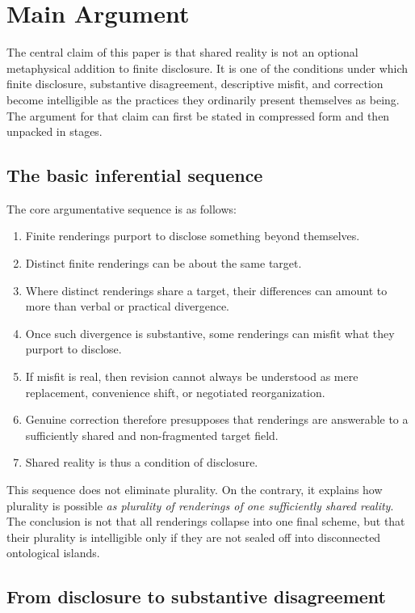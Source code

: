 \documentclass[11pt]{article}
\renewcommand{\emph}[1]{\textit{#1}}
\begin{document}
\section{Main Argument} 

The central claim of this paper is that shared reality is not an optional metaphysical addition to finite disclosure. It is one of the conditions under which finite disclosure, substantive disagreement, descriptive misfit, and correction become intelligible as the practices they ordinarily present themselves as being. The argument for that claim can first be stated in compressed form and then unpacked in stages.

\subsection{The basic inferential sequence}

The core argumentative sequence is as follows:

\begin{enumerate}
    \item Finite renderings purport to disclose something beyond themselves.
    \item Distinct finite renderings can be about the same target.
    \item Where distinct renderings share a target, their differences can amount to more than verbal or practical divergence.
    \item Once such divergence is substantive, some renderings can misfit what they purport to disclose.
    \item If misfit is real, then revision cannot always be understood as mere replacement, convenience shift, or negotiated reorganization.
    \item Genuine correction therefore presupposes that renderings are answerable to a sufficiently shared and non-fragmented target field.
    \item Shared reality is thus a condition of disclosure.
\end{enumerate}

This sequence does not eliminate plurality. On the contrary, it explains how plurality is possible \emph{as plurality of renderings of one sufficiently shared reality}. The conclusion is not that all renderings collapse into one final scheme, but that their plurality is intelligible only if they are not sealed off into disconnected ontological islands.

\subsection{From disclosure to substantive disagreement}
\end{document}
